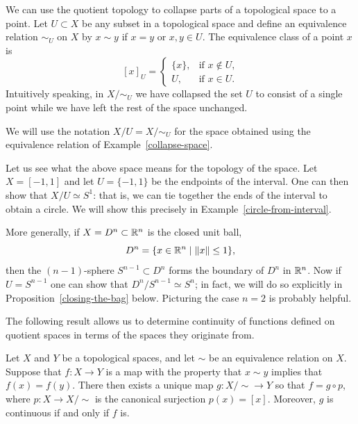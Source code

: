\begin{example}
  \label{collapse-space}
  We can use the quotient topology to collapse parts of a topological space to a point. Let $U \subset X$ be any subset in a topological space and define an equivalence relation $\sim_U$ on $X$ by $x \sim y$ if $x = y$ or $x,y \in U$. The equivalence class of a point $x$ is
  \[
    [x]_U = \begin{cases} \{x\},& \text{if $x \notin U$,} \\ U,& \text{if $x \in U$.} \end{cases}
  \]
  Intuitively speaking, in $X/\!\sim_U$ we have collapsed the set $U$ to consist of a single point while we have left the rest of the space unchanged.
\end{example}
We will use the notation $X/U = X/\!\sim_U$ for the space obtained using the equivalence relation of Example~\ref{collapse-space}.
\begin{example}
  \label{bag-closing-example}
  Let us see what the above space means for the topology of the space. Let $X = [-1,1]$ and let $U = \{-1,1\}$ be the endpoints of the interval. One can then show that $X/U \simeq S^1$: that is, we can tie together the ends of the interval to obtain a circle. We will show this precisely in Example~\ref{circle-from-interval}.
  
  More generally, if $X = D^n \subset \mathbb{R}^n$ is the closed unit ball, 
  \[
    D^n = \{x \in \mathbb{R}^n \mid \lVert x \rVert \leq 1 \},
  \]
  then the $(n-1)$-sphere $S^{n-1} \subset D^n$ forms the boundary of $D^n$ in $\mathbb{R}^n$. Now if $U = S^{n-1}$ one can show that $D^n/S^{n-1} \simeq S^n$; in fact, we will do so explicitly in Proposition~\ref{closing-the-bag} below. Picturing the case $n = 2$ is probably helpful.
\end{example}
The following result allows us to determine continuity of functions defined on quotient spaces in terms of the spaces they originate from.
\begin{lem}
  \label{universal-property-quotients}
  Let $X$ and $Y$ be a topological spaces, and let $\sim$ be an equivalence relation on $X$. Suppose that $f : X \to Y$ is a map with the property that $x \sim y$ implies that $f(x) = f(y)$. There then exists a unique map $g : X /\!\sim \to Y$ so that $f = g \circ p$, where $p : X \to X/\!\sim$ is the canonical surjection $p(x) = [x]$. Moreover, $g$ is continuous if and only if $f$ is.
\end{lem}
